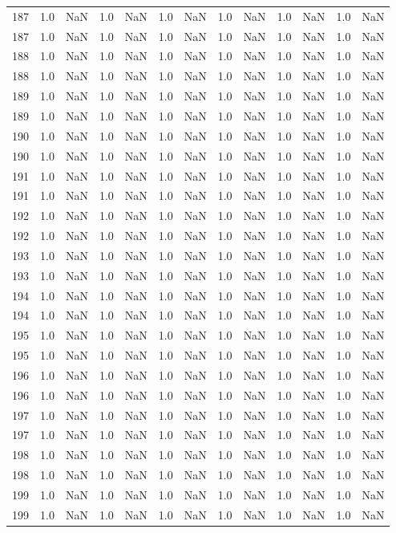 \begin{tabular}{lrrrrrrrrrrrr}
187 & 1.0 & NaN & 1.0 & NaN & 1.0 & NaN & 1.0 & NaN & 1.0 & NaN & 1.0 & NaN \\
187 & 1.0 & NaN & 1.0 & NaN & 1.0 & NaN & 1.0 & NaN & 1.0 & NaN & 1.0 & NaN \\
188 & 1.0 & NaN & 1.0 & NaN & 1.0 & NaN & 1.0 & NaN & 1.0 & NaN & 1.0 & NaN \\
188 & 1.0 & NaN & 1.0 & NaN & 1.0 & NaN & 1.0 & NaN & 1.0 & NaN & 1.0 & NaN \\
189 & 1.0 & NaN & 1.0 & NaN & 1.0 & NaN & 1.0 & NaN & 1.0 & NaN & 1.0 & NaN \\
189 & 1.0 & NaN & 1.0 & NaN & 1.0 & NaN & 1.0 & NaN & 1.0 & NaN & 1.0 & NaN \\
190 & 1.0 & NaN & 1.0 & NaN & 1.0 & NaN & 1.0 & NaN & 1.0 & NaN & 1.0 & NaN \\
190 & 1.0 & NaN & 1.0 & NaN & 1.0 & NaN & 1.0 & NaN & 1.0 & NaN & 1.0 & NaN \\
191 & 1.0 & NaN & 1.0 & NaN & 1.0 & NaN & 1.0 & NaN & 1.0 & NaN & 1.0 & NaN \\
191 & 1.0 & NaN & 1.0 & NaN & 1.0 & NaN & 1.0 & NaN & 1.0 & NaN & 1.0 & NaN \\
192 & 1.0 & NaN & 1.0 & NaN & 1.0 & NaN & 1.0 & NaN & 1.0 & NaN & 1.0 & NaN \\
192 & 1.0 & NaN & 1.0 & NaN & 1.0 & NaN & 1.0 & NaN & 1.0 & NaN & 1.0 & NaN \\
193 & 1.0 & NaN & 1.0 & NaN & 1.0 & NaN & 1.0 & NaN & 1.0 & NaN & 1.0 & NaN \\
193 & 1.0 & NaN & 1.0 & NaN & 1.0 & NaN & 1.0 & NaN & 1.0 & NaN & 1.0 & NaN \\
194 & 1.0 & NaN & 1.0 & NaN & 1.0 & NaN & 1.0 & NaN & 1.0 & NaN & 1.0 & NaN \\
194 & 1.0 & NaN & 1.0 & NaN & 1.0 & NaN & 1.0 & NaN & 1.0 & NaN & 1.0 & NaN \\
195 & 1.0 & NaN & 1.0 & NaN & 1.0 & NaN & 1.0 & NaN & 1.0 & NaN & 1.0 & NaN \\
195 & 1.0 & NaN & 1.0 & NaN & 1.0 & NaN & 1.0 & NaN & 1.0 & NaN & 1.0 & NaN \\
196 & 1.0 & NaN & 1.0 & NaN & 1.0 & NaN & 1.0 & NaN & 1.0 & NaN & 1.0 & NaN \\
196 & 1.0 & NaN & 1.0 & NaN & 1.0 & NaN & 1.0 & NaN & 1.0 & NaN & 1.0 & NaN \\
197 & 1.0 & NaN & 1.0 & NaN & 1.0 & NaN & 1.0 & NaN & 1.0 & NaN & 1.0 & NaN \\
197 & 1.0 & NaN & 1.0 & NaN & 1.0 & NaN & 1.0 & NaN & 1.0 & NaN & 1.0 & NaN \\
198 & 1.0 & NaN & 1.0 & NaN & 1.0 & NaN & 1.0 & NaN & 1.0 & NaN & 1.0 & NaN \\
198 & 1.0 & NaN & 1.0 & NaN & 1.0 & NaN & 1.0 & NaN & 1.0 & NaN & 1.0 & NaN \\
199 & 1.0 & NaN & 1.0 & NaN & 1.0 & NaN & 1.0 & NaN & 1.0 & NaN & 1.0 & NaN \\
199 & 1.0 & NaN & 1.0 & NaN & 1.0 & NaN & 1.0 & NaN & 1.0 & NaN & 1.0 & NaN \\
\bottomrule
\end{tabular}
